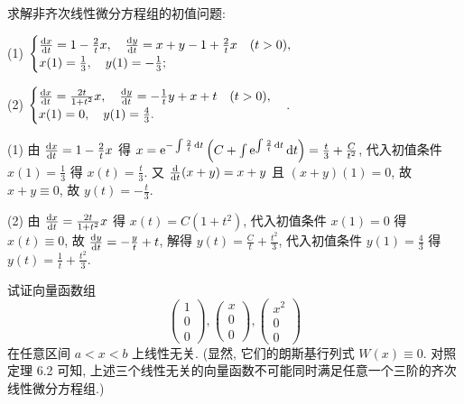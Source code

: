 


\begin{exercise}
  求解非齐次线性微分方程组的初值问题:

  (1) $\begin{cases}
    \frac{\mathop{}\!\mathrm{d} x}{\mathop{}\!\mathrm{d} t} = 1-\frac{2}{t}x,\quad\frac{\mathop{}\!\mathrm{d} y}{\mathop{}\!\mathrm{d} t}=x+y-1+\frac{2}{t}x\quad(t>0),\\
    x(1) = \frac{1}{3},\quad y(1)=-\frac{1}{3};\end{cases}$

  (2) $\begin{cases}
  \frac{\mathop{}\!\mathrm{d} x}{\mathop{}\!\mathrm{d} t}=\frac{2t}{1+t^2}x,\quad\frac{\mathop{}\!\mathrm{d} y}{\mathop{}\!\mathrm{d} t}=-\frac{1}{t}y+x+t\quad(t>0),\\
  x(1)=0,\quad y(1)=\frac{4}{3}.
  \end{cases}$.
\end{exercise}

\begin{solve}
  (1) 由 $\frac{\mathop{}\!\mathrm{d} x}{\mathop{}\!\mathrm{d} t}=1-\frac{2}{t}x$ 得 
  $x=\mathrm{e}^{-\int\frac{2}{t}\mathop{}\!\mathrm{d} t}\left(C+\int\mathrm{e}^{\int\frac{2}{t}\mathop{}\!\mathrm{d} t}\mathop{}\!\mathrm{d} t\right)=\frac{t}{3}+\frac{C}{t^2}$, 
  代入初值条件 $x(1)=\frac{1}{3}$ 得 $x(t)=\frac{t}{3}$. 
  又 $\frac{\mathop{}\!\mathrm{d}}{\mathop{}\!\mathrm{d} t}(x+y)=x+y$ 且 $(x+y)(1)=0$, 
  故 $x+y\equiv 0$, 故 $y(t)=-\frac{t}{3}$.

  (2) 由 $\frac{\mathop{}\!\mathrm{d} x}{\mathop{}\!\mathrm{d} t}=\frac{2t}{1+t^2}x$ 得 $x(t)=C(1+t^2)$, 
  代入初值条件 $x(1)=0$ 得 $x(t)\equiv 0$, 
  故 $\frac{\mathop{}\!\mathrm{d} y}{\mathop{}\!\mathrm{d} t}=-\frac{y}{t}+t$, 
  解得 $y(t)=\frac{C}{t}+\frac{t^2}{3}$, 
  代入初值条件 $y(1)=\frac{4}{3}$ 得 $y(t)=\frac{1}{t}+\frac{t^2}{3}$.
\end{solve}



\begin{exercise}
  试证向量函数组
  \[\begin{pmatrix}1\\0\\0\end{pmatrix},\begin{pmatrix}x\\0\\0\end{pmatrix},\begin{pmatrix}x^2\\0\\0\end{pmatrix}\]
  在任意区间 $a<x<b$ 上线性无关. (显然, 它们的朗斯基行列式 $W(x)\equiv 0$. 对照定理 6.2 可知, 
  上述三个线性无关的向量函数不可能同时满足任意一个三阶的齐次线性微分方程组.)
\end{exercise}

